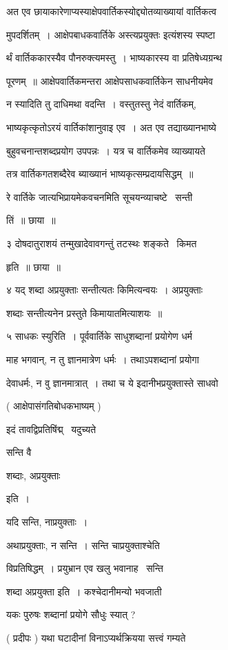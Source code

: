 \documentclass[11pt, openany]{book}
\begin{document}
अत एव छायाकारेणाप्यस्याक्षेपवार्तिकस्योद्द्योतव्याख्यायां वार्तिकत्व \textendash\ 

मुपदर्शितम्~। आक्षेपबाधकवार्तिके {\qt अस्त्यप्रयुक्तः} इत्यंशस्य स्पष्टा \textendash\ 

र्थं वार्तिककारस्यैव पौनरुक्त्यमस्तु~। भाष्यकारस्य वा प्रतिषेध्यग्रन्थ \textendash\ 


पूरणम्~॥ आक्षेपवार्तिकमन्तरा आक्षेपसाधकवार्तिकेन साधनीयमेव 

न स्यादिति तु दाधिमथा वदन्ति~। वस्तुतस्तु नेदं वार्तिकम्, 

भाष्यकृत्कृतोऽरयं वार्तिकांशानुवाइ एव~। अत एव तद्याख्यानभाष्ये 

बुहुवचनान्तशब्दप्रयोग उपपन्नः~। यत्र च वार्तिकमेव व्याख्यायते 

तत्र वार्तिकगतशब्दैरेव ब्याख्यानं भाष्यकृत्सम्प्रदायसिद्धम्~॥ 

रे वार्तिके जात्यभिप्रायमेकवचनमिति सूचयन्व्याचष्टे \textendash\ सन्ती \textendash\ 

तिं~॥ छाया~॥ 

३ दोषदातुराशयं तन्मुखादेवावगन्तुं तटस्थः शङ्कते \textendash\ किमत 

हृति~॥ छाया~॥ 

४ यद् शब्दा अप्रयुक्ताः सन्तीत्यतः किमित्यन्वयः~। अप्रयुक्ताः 

शब्दाः सन्तीत्यनेन प्रस्तुते किमायातमित्याशयः~॥ 

५ साधकः स्युरिति~। पूर्ववार्तिके साधुशब्दानां प्रयोगेण धर्म \textendash\ 

माह भगवान्, न तु ज्ञानमात्रेण धर्मः~। तथाऽपशब्दानां प्रयोगा \textendash\ 

देवाधर्मः, न वु ज्ञानमात्रात्~। तथा च ये इदानीभप्रयुक्तास्ते साधवो 





( आक्षेपासंगतिबोधकभाष्यम् )

इदं तावद्विप्रतिषिंद्म् \textendash\ यदुच्यते \textendash\ {\qt सन्ति वै 

शब्दाः, अप्रयुक्ताः} इति~। 

यदि सन्ति, नाप्रयुक्ताः~। 

 अथाप्रयुक्ताः, न सन्ति~। सन्ति चाप्रयुक्ताश्चेति 

विप्रतिषिद्धम्~। प्रयुभ्रान एव खलु भवानाह \textendash\ सन्ति 

शब्दा अप्रयुक्ता इति~। कश्चेदानीमन्यो भवजाती \textendash\ 

यकः पुरुषः शब्दानां प्रयोगे सौधुः स्यात् ? 

( प्रदीपः ) यथा घटादीनां विनाऽप्यर्थक्रियया सत्त्वं गम्यते 
\end{document}
